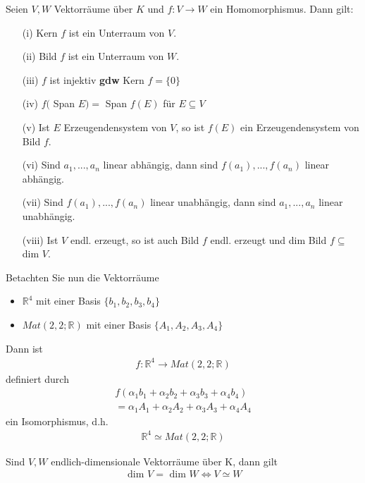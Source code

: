 \documentclass[11pt]{report}
\newcommand*\Zb[1] {\mathbb{#1}}
\newcommand*\f[1] {\textbf{#1}}
\begin{document}
\begin{lemma}
 \label{lemma421}
Seien $V, W$ Vektorräume über $K$ und $f: V \rightarrow W$ ein Homomorphismus. Dann gilt:
\begin{itemize}
 \item[(i)] Kern $f$ ist ein Unterraum von $V$.
 \item[(ii)] Bild $f$ ist ein Unterraum von $W$.
 \item[(iii)] $f$ ist injektiv \f{gdw} Kern $f = \{0\}$
 \item[(iv)] $f($ Span $E) = $ Span $f(E)$ für $E \subseteq V$
 \item[(v)] Ist $E$ Erzeugendensystem von $V$, so ist $f(E)$ ein Erzeugendensystem von Bild $f$.
 \item[(vi)] Sind $a_1, ..., a_n$ linear abhängig, dann sind $f(a_1), ..., f(a_n)$ linear abhängig.
 \item[(vii)] Sind $f(a_1), ..., f(a_n)$ linear unabhängig, dann sind $a_1, ..., a_n$ linear unabhängig.
 \item[(viii)]  Ist $V$ endl. erzeugt, so ist auch Bild $f$ endl. erzeugt und dim Bild $f \subseteq $ dim $V$.
\end{itemize}
\end{lemma}
\vspace*{0.5cm}
Betachten Sie nun die Vektorräume 
\begin{itemize}
 \item $\Zb{R}^4$ mit einer Basis  $\{b_1, b_2, b_3, b_4\}$
 \item $Mat(2,2; \Zb{R})$ mit einer Basis $\{A_1, A_2, A_3, A_4\}$
\end{itemize}
Dann ist 
\begin{align}
 f: \Zb{R}^4 \rightarrow Mat(2,2; \Zb{R})
\end{align}
definiert durch
\begin{align}
 f(\alpha_1 b_1 + \alpha_2 b_2 + \alpha_3 b_3 + \alpha_4 b_4) \\
= \alpha_1 A_1 + \alpha_2 A_2 + \alpha_3 A_3 + \alpha_4 A_4
\end{align}
ein Isomorphismus, d.h.
\begin{align}
 \Zb{R}^4 \simeq Mat(2,2; \Zb{R})
\end{align}

\begin{satz}
 \label{satz422}
Sind $V, W$ endlich-dimensionale Vektorräume über K, dann gilt
\begin{align}
 \text{ dim } V = \text{ dim } W \Leftrightarrow V \simeq W
\end{align}
\end{satz}
\end{document}
